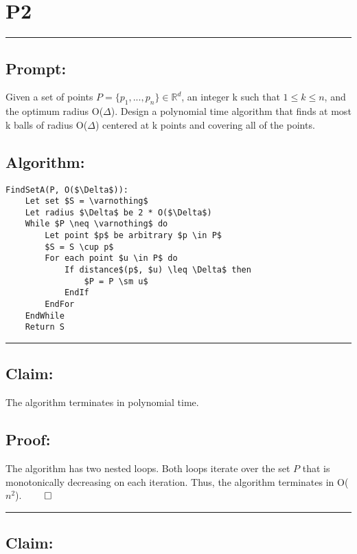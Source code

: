 \documentclass[11pt]{article}
\title{}
\author{}
\date{}
\newcommand{\R}{\mathbb{R}}
\def\sm{\setminus}
\begin{document}
\section*{P2}

\noindent\textcolor[RGB]{220,220,220}{\rule{\linewidth}{0.8pt}}

\subsection*{Prompt:} 

Given a set of points $P = \{p_1, ..., p_n\} \in \R^d$, an integer k such that $1 \leq k \leq n$, and the optimum radius O($\Delta$). Design a polynomial time algorithm that finds at most k balls of radius O($\Delta$) centered at k points and covering all of the points. 

\subsection*{Algorithm:} 

\begin{lstlisting}[basicstyle=\small, mathescape=true]
FindSetA(P, O($\Delta$)):	
	Let set $S = \varnothing$
	Let radius $\Delta$ be 2 * O($\Delta$)
	While $P \neq \varnothing$ do
		Let point $p$ be arbitrary $p \in P$
		$S = S \cup p$
		For each point $u \in P$ do
			If distance$(p$, $u) \leq \Delta$ then
				$P = P \sm u$
			EndIf
		EndFor
	EndWhile
	Return S
\end{lstlisting}

\noindent\textcolor[RGB]{220,220,220}{\rule{\linewidth}{0.8pt}}
\linebreak

\subsection*{Claim:}

The algorithm terminates in polynomial time.

\subsection*{Proof:}

The algorithm has two nested loops. Both loops iterate over the set $P$ that is monotonically decreasing on each iteration. Thus, the algorithm terminates in O($n^2$). $\qed$

\noindent\textcolor[RGB]{220,220,220}{\rule{\linewidth}{0.8pt}}

\subsection*{Claim:}
\end{document}
